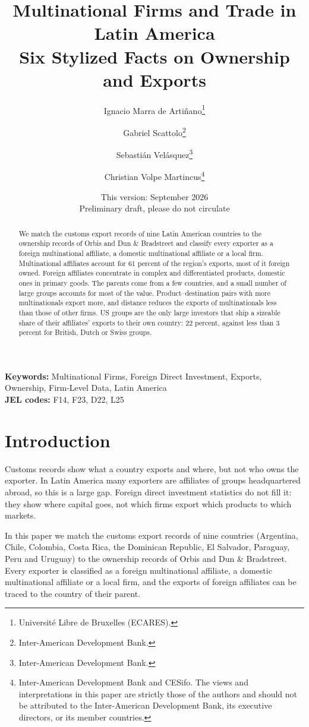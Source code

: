 \documentclass[11pt,a4paper]{article}
\title{\textbf{Multinational Firms and Trade in Latin America}\\[6pt]\large Six Stylized Facts on Ownership and Exports}
\author{Ignacio Marra de Arti\~nano\thanks{Universit\'e Libre de Bruxelles (ECARES).}
 \and Gabriel Scattolo\thanks{Inter-American Development Bank.}
 \and Sebasti\'an Vel\'asquez\thanks{Inter-American Development Bank.}
 \and Christian Volpe Martincus\thanks{Inter-American Development Bank and CESifo. The views and
interpretations in this paper are strictly those of the authors and should not be attributed to
the Inter-American Development Bank, its executive directors, or its member countries.}}
\date{This version: September 2026 \\[2pt] \small Preliminary draft, please do not circulate}
\begin{document}
\maketitle
\thispagestyle{empty}
\begin{abstract}\noindent We match the customs export records of nine Latin American countries to the ownership records of
Orbis and Dun \& Bradstreet and classify every exporter as a foreign multinational affiliate, a
domestic multinational affiliate or a local firm. Multinational affiliates account for 61 percent
of the region's exports, most of it foreign owned. Foreign affiliates concentrate in complex and
differentiated products, domestic ones in primary goods. The parents come from a few countries,
and a small number of large groups accounts for most of the value. Product--destination pairs with
more multinationals export more, and distance reduces the exports of multinationals less than
those of other firms. US groups are the only large investors that ship a sizeable share of their
affiliates' exports to their own country: 22 percent, against less than 3 percent for British,
Dutch or Swiss groups.
\end{abstract}
\vspace{4pt}
\noindent\textbf{Keywords:} Multinational Firms, Foreign Direct Investment, Exports, Ownership, Firm-Level Data, Latin America \\
\noindent\textbf{JEL codes:} F14, F23, D22, L25
\clearpage
\tableofcontents
\clearpage

\section{Introduction}\label{sec:intro}
Customs records show what a country exports and where, but not who owns the exporter. In Latin
America many exporters are affiliates of groups headquartered abroad, so this is a large gap.
Foreign direct investment statistics do not fill it: they show where capital goes, not which
firms export which products to which markets.

In this paper we match the customs export records of nine countries (Argentina, Chile, Colombia,
Costa Rica, the Dominican Republic, El Salvador, Paraguay, Peru and Uruguay) to the ownership
records of Orbis and Dun \& Bradstreet. Every exporter is classified as a foreign multinational
affiliate, a domestic multinational affiliate or a local firm, and the exports of foreign
affiliates can be traced to the country of their parent.
\end{document}
